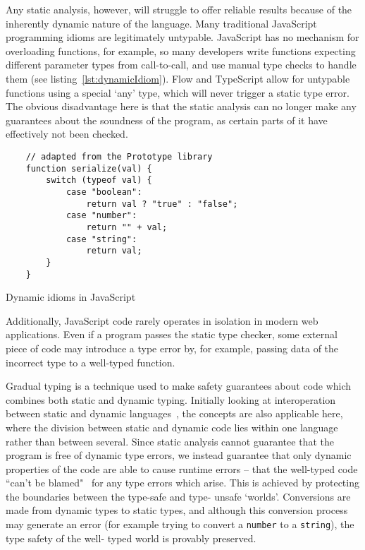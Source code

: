 \documentclass[12pt,a4paper,twoside,openright]{report}
\begin{document}
Any static analysis, however, will struggle to offer reliable results because
of the inherently dynamic nature of the language. Many traditional JavaScript
programming idioms are legitimately untypable. JavaScript has no
mechanism for overloading functions, for example, so many developers write
functions expecting different parameter types from call-to-call, and use manual
type checks to handle them (see listing~\ref{lst:dynamicIdiom}). Flow and
TypeScript allow for untypable functions using a special `any' type, which will
never trigger a static type error. The obvious disadvantage here is that the
static analysis can no longer make any guarantees about the soundness of the
program, as certain parts of it have effectively not been checked.
\begin{program}[t]
 \begin{verbatim}
 	// adapted from the Prototype library
 	function serialize(val) {
	 	switch (typeof val) {
		 	case "boolean":
			 	return val ? "true" : "false";
		 	case "number":
			 	return "" + val;
		 	case "string":
			 	return val;
	 	}
 	}	
 \end{verbatim}
 \label{lst:dynamicIdiom}
 \caption{Dynamic idioms in JavaScript}
\end{program}
Additionally, JavaScript code rarely operates in isolation in modern web
applications. Even if a program passes the static type checker, some external
piece of code may introduce a type error by, for example, passing data of the
incorrect type to a well-typed function.

Gradual typing is a technique used to make safety guarantees about code which
combines both static and dynamic typing. Initially looking at interoperation
between static and dynamic languages~\cite{gray2005fine}, the concepts are
also applicable here, where the division between static and dynamic code lies
within one language rather than between several. Since static analysis cannot
guarantee that the program is free of dynamic type errors, we instead
guarantee that only dynamic properties of the code are able to cause runtime
errors -- that the well-typed code ``can't be blamed"~\cite{cantblame} for
any type errors which arise. This is achieved by protecting the boundaries
between the type-safe and type- unsafe `worlds'. Conversions are made from
dynamic types to static types, and although this conversion process may
generate an error (for example trying to convert a \texttt{number} to a
\texttt{string}), the type safety of the well- typed world is provably
preserved.
\end{document}
